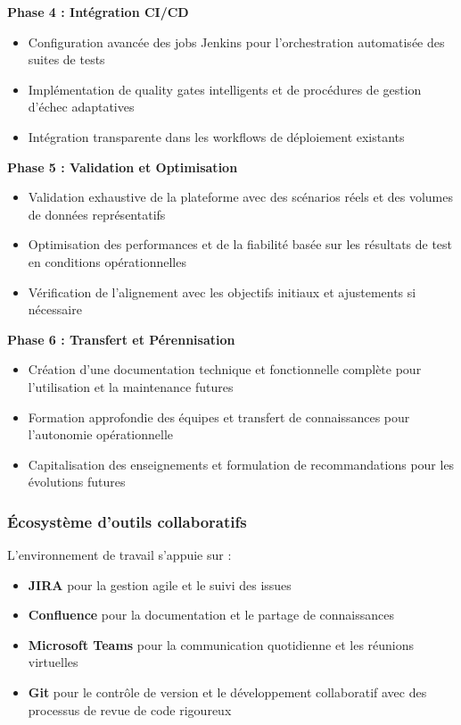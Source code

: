 \textbf{Phase 4 : Intégration CI/CD}
\begin{itemize}
    \item Configuration avancée des jobs Jenkins pour l'orchestration automatisée des suites de tests
    \item Implémentation de quality gates intelligents et de procédures de gestion d'échec adaptatives
    \item Intégration transparente dans les workflows de déploiement existants
\end{itemize}

\textbf{Phase 5 : Validation et Optimisation}
\begin{itemize}
    \item Validation exhaustive de la plateforme avec des scénarios réels et des volumes de données représentatifs
    \item Optimisation des performances et de la fiabilité basée sur les résultats de test en conditions opérationnelles
    \item Vérification de l'alignement avec les objectifs initiaux et ajustements si nécessaire
\end{itemize}

\textbf{Phase 6 : Transfert et Pérennisation}
\begin{itemize}
    \item Création d'une documentation technique et fonctionnelle complète pour l'utilisation et la maintenance futures
    \item Formation approfondie des équipes et transfert de connaissances pour l'autonomie opérationnelle
    \item Capitalisation des enseignements et formulation de recommandations pour les évolutions futures
\end{itemize}

\subsubsection{Écosystème d'outils collaboratifs}

L'environnement de travail s'appuie sur :
\begin{itemize}
    \item \textbf{JIRA} pour la gestion agile et le suivi des issues
    \item \textbf{Confluence} pour la documentation et le partage de connaissances
    \item \textbf{Microsoft Teams} pour la communication quotidienne et les réunions virtuelles
    \item \textbf{Git} pour le contrôle de version et le développement collaboratif avec des processus de revue de code rigoureux
\end{itemize}

